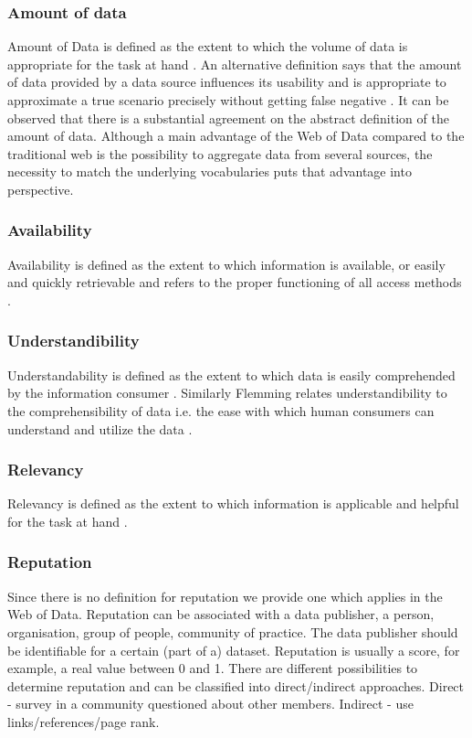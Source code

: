 \subsubsection{Amount of data}
Amount of Data is defined as the extent to which the volume of data is appropriate
for the task at hand \cite{Bizerthesis}.
An alternative definition says that the amount of data provided by a data source influences its usability \cite{Flemming} and is appropriate to approximate a true scenario precisely without getting false negative 	\cite{Chen}. It can be observed that there is a substantial agreement on the abstract definition of the amount of data. Although a main advantage of the Web of Data compared to the traditional web is the possibility to aggregate data from several sources, the necessity to match the underlying vocabularies puts that advantage into perspective. 

\subsubsection{Availability}
Availability is defined as the extent to which information is available, or easily and quickly retrievable  \cite{Bizerthesis} and refers to the proper functioning of all access methods \cite{Flemming}. 

\subsubsection{Understandibility}
Understandability is defined as the extent to which data is easily comprehended by the information consumer \cite{Bizerthesis}. Similarly Flemming relates understandibility to the comprehensibility of data i.e. the ease with which human consumers can understand and utilize the data \cite{Flemming}.

\subsubsection{Relevancy}
Relevancy is defined as the extent to which information is applicable and helpful for the task at hand  \cite{Bizerthesis}. 

\subsubsection{Reputation}
Since there is no definition for reputation we provide one which applies in the Web of Data. Reputation can be associated with a data publisher, a person, organisation, group of people, community of practice.
The data publisher should be identifiable for a certain (part of a) dataset. Reputation is usually a score, for example, a real value between 0 and 1. There are different possibilities to determine reputation and can be classified into direct/indirect approaches. Direct - survey in a community questioned about other members.
Indirect - use links/references/page rank.
